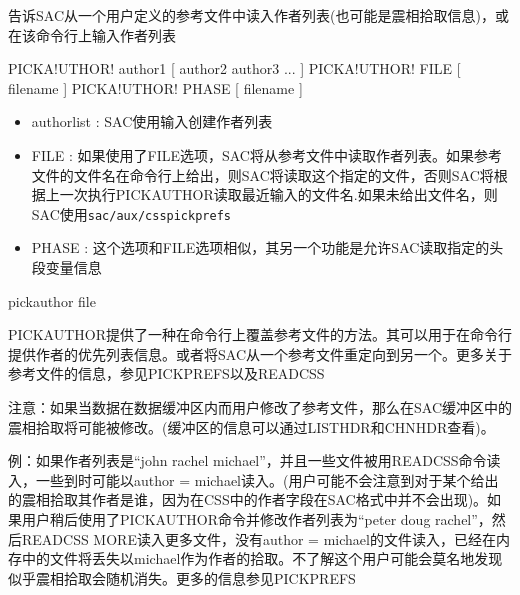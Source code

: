 \label{cmd:pickauthor}

告诉SAC从一个用户定义的参考文件中读入作者列表(也可能是震相拾取信息)，或在该命令行上输入作者列表

\begin{SACSTX}
PICKA!UTHOR! author1 [ author2 author3 ... ]
PICKA!UTHOR! FILE [ filename ]
PICKA!UTHOR! PHASE [ filename ]
\end{SACSTX}

\begin{itemize}
\item authorlist : SAC使用输入创建作者列表
\item FILE : 如果使用了FILE选项，SAC将从参考文件中读取作者列表。如果参考文件的文件名在命令行上给出，则SAC将读取这个指定的文件，否则SAC将根据上一次执行PICKAUTHOR读取最近输入的文件名.如果未给出文件名，则SAC使用\texttt{sac/aux/csspickprefs}
\item PHASE : 这个选项和FILE选项相似，其另一个功能是允许SAC读取指定的头段变量信息
\end{itemize}

\begin{SACDFT}
pickauthor file
\end{SACDFT}

PICKAUTHOR提供了一种在命令行上覆盖参考文件的方法。其可以用于在命令行提供作者的优先列表信息。或者将SAC从一个参考文件重定向到另一个。更多关于参考文件的信息，参见PICKPREFS以及READCSS

注意：如果当数据在数据缓冲区内而用户修改了参考文件，那么在SAC缓冲区中的震相拾取将可能被修改。(缓冲区的信息可以通过LISTHDR和CHNHDR查看)。

例：如果作者列表是``john rachel michael''，并且一些文件被用READCSS命令读入，一些到时可能以author = michael读入。(用户可能不会注意到对于某个给出的震相拾取其作者是谁，因为在CSS中的作者字段在SAC格式中并不会出现)。如果用户稍后使用了PICKAUTHOR命令并修改作者列表为``peter doug rachel''，然后READCSS MORE读入更多文件，没有author = michael的文件读入，已经在内存中的文件将丢失以michael作为作者的拾取。不了解这个用户可能会莫名地发现似乎震相拾取会随机消失。更多的信息参见PICKPREFS
